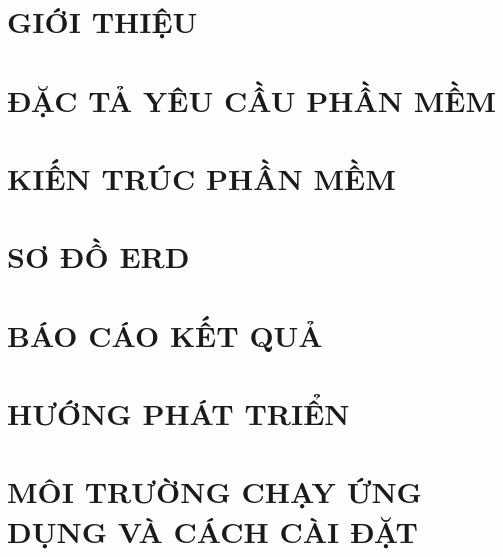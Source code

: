 \documentclass[a4paper,12pt]{report}
\begin{document}


\tableofcontents
\newpage



\newpage

\chapter{GIỚI THIỆU}



\chapter{ĐẶC TẢ YÊU CẦU PHẦN MỀM}


\chapter{KIẾN TRÚC PHẦN MỀM}



\chapter{SƠ ĐỒ ERD}




\chapter{BÁO CÁO KẾT QUẢ}


\chapter{HƯỚNG PHÁT TRIỂN}


\chapter{MÔI TRƯỜNG CHẠY ỨNG DỤNG VÀ CÁCH CÀI ĐẶT}

\end{document}
